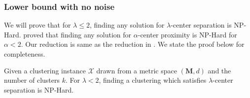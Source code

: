 \documentclass[anon,12pt]{colt2016} %
\newcommand{\mc}{\mathcal}
\newcommand{\mb}{\mathbf}
\begin{document}

\subsubsection{Lower bound with no noise}
We will prove that for $\lambda \le 2$, finding any solution for $\lambda$-center separation is NP-Hard. \cite{reyzin2012data} proved that finding any solution for $\alpha$-center proximity is NP-Hard for $\alpha < 2$. Our reduction is same as the reduction in \cite{reyzin2012data}. We state the proof below for completeness.

\begin{theorem}
Given a clustering instance $\mc X$ drawn from a metric space $(\mb M, d)$ and the number of clusters $k$. For $\lambda < 2$, finding a clustering which satisfies $\lambda$-center separation is NP-Hard.
\end{theorem}
\end{document}
